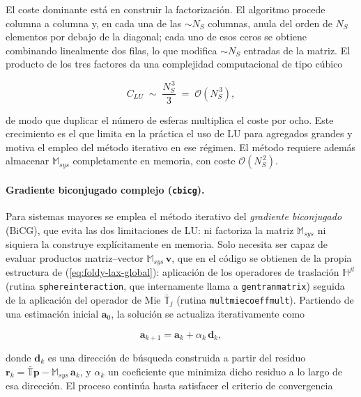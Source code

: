 El coste dominante está en construir la factorización. El algoritmo
procede columna a columna y, en cada una de las $\sim N_S$ columnas,
anula del orden de $N_S$ elementos por debajo de la diagonal; cada uno
de esos ceros se obtiene combinando linealmente dos filas, lo que
modifica $\sim N_S$ entradas de la matriz. El producto de los tres
factores da una complejidad computacional de tipo cúbico

\begin{equation}
  C_{LU} \;\sim\; \frac{N_S^{\,3}}{3} \;=\; \mathcal{O}(N_S^{\,3}),
\end{equation}

de modo que duplicar el número de esferas multiplica el coste por ocho.
Este crecimiento es el que limita en la práctica el uso de LU para
agregados grandes y motiva el empleo del método iterativo en ese
régimen. El método requiere además almacenar $\mathbb{M}_{sys}$
completamente en memoria, con coste $\mathcal{O}(N_S^{\,2})$.

\paragraph{Gradiente biconjugado complejo (\texttt{cbicg}).}
Para sistemas mayores se emplea el método iterativo del
\textit{gradiente biconjugado} (BiCG), que evita las dos limitaciones
de LU: ni factoriza la matriz  $\mathbb{M}_{sys}$ ni siquiera la construye explícitamente
en memoria. Solo necesita ser capaz de evaluar productos
matriz--vector $\mathbb{M}_{sys}\,\mathbf{v}$, que en el código se
obtienen de la propia estructura de
(\ref{eq:foldy-lax-global}): aplicación de los operadores de traslación
$\mathbb{H}^{jl}$ (rutina \texttt{sphereinteraction}, que internamente
llama a \texttt{gentranmatrix}) seguida de la aplicación del operador
de Mie $\bar{\mathbb{T}}_j$ (rutina \texttt{multmiecoeffmult}). Partiendo
de una estimación inicial $\mathbf{a}_0$, la solución se actualiza
iterativamente como

\begin{equation}
  \mathbf{a}_{k+1} = \mathbf{a}_k + \alpha_k\,\mathbf{d}_k,
\end{equation}

donde $\mathbf{d}_k$ es una dirección de búsqueda construida a partir
del residuo
$\mathbf{r}_k = \bar{\mathbb{T}}\mathbf{p} - \mathbb{M}_{sys}\,\mathbf{a}_k$,
y $\alpha_k$ un coeficiente que minimiza dicho residuo a lo largo de
esa dirección. El proceso continúa hasta satisfacer el criterio de
convergencia


